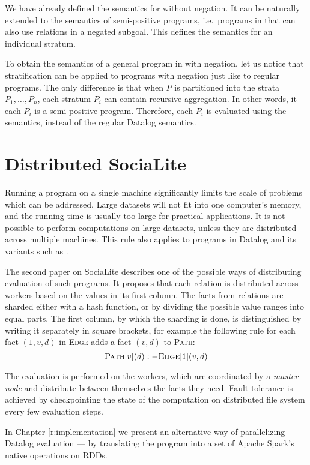 We have already defined the semantics for \datalogra without negation. It can be naturally extended to the semantics of semi-positive \datalogra programs, i.e.\ programs in \datalogra that can also use \edb relations in a negated subgoal. This defines the semantics for an individual stratum.

To obtain the semantics of a general program in \datalogra with negation, let us notice that stratification can be applied to \datalogra programs with negation just like to regular \datalogneg programs. The only difference is that when $P$ is partitioned into the strata $P_1, \dots, P_n$, each stratum $P_i$ can contain recursive aggregation. In other words, it each $P_i$ is a semi-positive \datalogra program. Therefore, each $P_i$ is evaluated using the \datalogra semantics, instead of the regular Datalog semantics.

\section{Distributed SociaLite}\label{s:distributed}
Running a program on a single machine significantly limits the scale of problems which can be addressed. Large datasets will not fit into one computer's memory, and the running time is usually too large for practical applications. It is not possible to perform computations on large datasets, unless they are distributed across multiple machines. This rule also applies to programs in Datalog and its variants such as \datalogra.

The second paper on SociaLite \cite{distsoc} describes one of the possible ways of distributing evaluation of such programs. It proposes that each relation is distributed across workers based on the values in its first column. The facts from relations are sharded either with a hash function, or by dividing the possible value ranges into equal parts. The first column, by which the sharding is done, is distinguished by writing it separately in square brackets, for example the following rule for each fact $(1, v, d)$ in \textsc{Edge} adds a fact $(v, d)$ to \textsc{Path}:
$$\textsc{Path}[v](d) :- \textsc{Edge}[1](v, d)$$

The evaluation is performed on the workers, which are coordinated by a \emph{master node} and distribute between themselves the facts they need. Fault tolerance is achieved by checkpointing the state of the computation on distributed file system every few evaluation steps.

In Chapter \ref{r:implementation} we present an alternative way of parallelizing Datalog evaluation --- by translating the program into a set of Apache Spark's native operations on RDDs.

